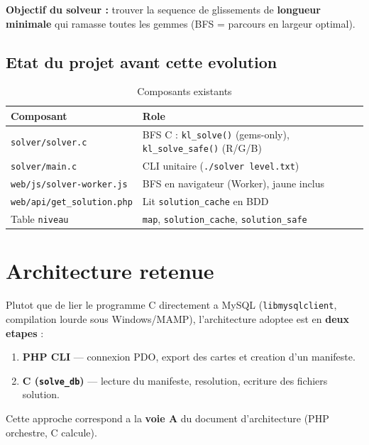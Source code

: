 \documentclass[11pt,a4paper]{article}
\begin{document}
\textbf{Objectif du solveur :} trouver la sequence de glissements de \textbf{longueur minimale} qui ramasse toutes les gemmes (BFS = parcours en largeur optimal).

\subsection{Etat du projet avant cette evolution}

\begin{table}[h]
\centering
\small
\begin{tabular}{@{}ll@{}}
\toprule
\textbf{Composant} & \textbf{Role} \\
\midrule
\texttt{solver/solver.c} & BFS C : \texttt{kl\_solve()} (gems-only), \texttt{kl\_solve\_safe()} (R/G/B) \\
\texttt{solver/main.c} & CLI unitaire (\texttt{./solver level.txt}) \\
\texttt{web/js/solver-worker.js} & BFS en navigateur (Worker), jaune inclus \\
\texttt{web/api/get\_solution.php} & Lit \texttt{solution\_cache} en BDD \\
Table \texttt{niveau} & \texttt{map}, \texttt{solution\_cache}, \texttt{solution\_safe} \\
\bottomrule
\end{tabular}
\caption{Composants existants}
\end{table}

\section{Architecture retenue}

Plutot que de lier le programme C directement a MySQL (\texttt{libmysqlclient}, compilation lourde sous Windows/MAMP), l'architecture adoptee est en \textbf{deux etapes} :

\begin{enumerate}
    \item \textbf{PHP CLI} --- connexion PDO, export des cartes et creation d'un manifeste.
    \item \textbf{C (\texttt{solve\_db})} --- lecture du manifeste, resolution, ecriture des fichiers solution.
\end{enumerate}

Cette approche correspond a la \textbf{voie A} du document d'architecture (PHP orchestre, C calcule).
\end{document}
